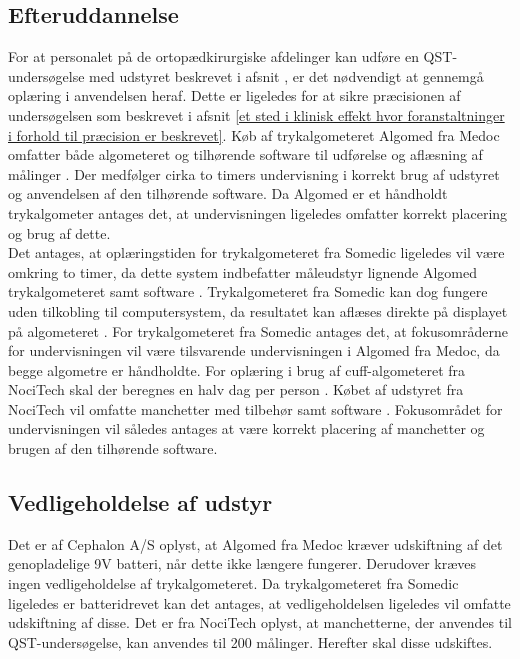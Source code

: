 \subsection{Efteruddannelse}
For at personalet på de ortopædkirurgiske afdelinger kan udføre en QST-undersøgelse med udstyret beskrevet i afsnit , er det nødvendigt at gennemgå oplæring i anvendelsen heraf. Dette er ligeledes for at sikre præcisionen af undersøgelsen som beskrevet i afsnit \ref{et sted i klinisk effekt hvor foranstaltninger i forhold til præcision er beskrevet}. Køb af trykalgometeret Algomed fra Medoc omfatter både algometeret og tilhørende software til udførelse og aflæsning af målinger \citep{AlgomedData}. Der medfølger cirka to timers undervisning i korrekt brug af udstyret og anvendelsen af den tilhørende software. Da Algomed er et håndholdt trykalgometer antages det, at undervisningen ligeledes omfatter korrekt placering og brug af dette. \\
Det antages, at oplæringstiden for trykalgometeret fra Somedic ligeledes vil være omkring to timer, da dette system indbefatter måleudstyr lignende Algomed trykalgometeret samt software \citep{SomedicSenselab2016}. Trykalgometeret fra Somedic kan dog fungere uden tilkobling til computersystem, da resultatet kan aflæses direkte på displayet på algometeret \citep{SomedicSenselab2016}. For trykalgometeret fra Somedic antages det, at fokusområderne for undervisningen vil være tilsvarende undervisningen i Algomed fra Medoc, da begge algometre er håndholdte.
For oplæring i brug af cuff-algometeret fra NociTech skal der beregnes en halv dag per person \citep{mail_fra_nocitech}. Købet af udstyret fra NociTech vil omfatte manchetter med tilbehør samt software \citep{NociTech2016}. Fokusområdet for undervisningen vil således antages at være korrekt placering af manchetter og brugen af den tilhørende software.   


\subsection{Vedligeholdelse af udstyr}
Det er af Cephalon A/S oplyst, at Algomed fra Medoc kræver udskiftning af det genopladelige 9V batteri, når dette ikke længere fungerer. Derudover kræves ingen vedligeholdelse af trykalgometeret. Da trykalgometeret fra Somedic ligeledes er batteridrevet kan det antages, at vedligeholdelsen ligeledes vil omfatte udskiftning af disse. 
Det er fra NociTech oplyst, at manchetterne, der anvendes til QST-undersøgelse, kan anvendes til 200 målinger. Herefter skal disse udskiftes.


